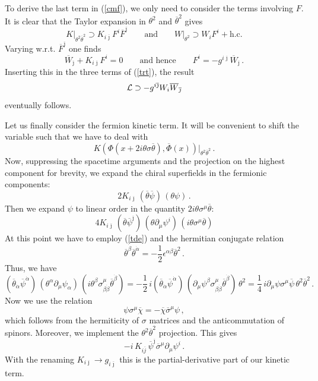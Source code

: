 \documentclass[12pt]{article}
\newcommand{\be}{\begin{equation}}
\newcommand{\ee}{\end{equation}}
\newcommand{\ol}{\overline}
\numberwithin{equation}{section}
\begin{document}
To derive the last term in (\ref{cmf}), we only need to consider the terms involving $F$. It is clear that the Taylor expansion in $\theta^2$ and $\ol{\theta}^2$ gives
\be
K\Big|_{\theta^2\ol{\theta}^2}\supset K_{i\ol{\jmath}}F^i\ol{F}^{\ol{\jmath}}
\qquad\mbox{and}\qquad
W\Big|_{\theta^2}\supset W_i F^i +\mbox{h.c.}\label{trt}
\ee
Varying w.r.t. $\ol{F}^{\ol{\jmath}}$ one finds 
\be
\ol{W}_{\ol{\jmath}}+K_{i\ol{\jmath}}F^i=0\qquad\mbox{and hence}\qquad
F^i=-g^{i\ol{\jmath}}\ol{W}_{\ol{\jmath}}\,.
\ee
Inserting this in the three terms of (\ref{trt}), the result
\be
{\cal L}\supset -g^{i\ol{\jmath}} W_i \ol{W}_{\ol{\jmath}}
\ee
eventually follows.

Let us finally consider the fermion kinetic term. It will be convenient to shift the variable such that we have to deal with
\be
K(\Phi(x+2i\theta\sigma\ol{\theta}),\ol{\Phi}(x))\Big|_{\theta^2\ol{\theta}^2}\,.
\ee
Now, suppressing the spacetime arguments and the projection on the highest component for brevity, we expand the chiral superfields in the fermionic components:
\be
2K_{i\ol{\jmath}}\,(\ol{\theta}\ol{\psi})\,(\theta\psi)\,.
\ee
Then we expand $\psi$ to linear order in the quantity $2i\theta\sigma^\mu\ol{\theta}$:
\be
4K_{i\ol{\jmath}}\,(\ol{\theta}\ol{\psi}^{\ol{\jmath}})\,
(\theta\partial_\mu\psi^i)\,(i\theta \sigma^\mu\ol{\theta})
\ee
At this point we have to employ (\ref{tde}) and the hermitian conjugate relation 
\be
\ol{\theta}^{\dot{\beta}}\ol{\theta}^{\dot{\alpha}}=-\frac{1}{2}\epsilon^{\alpha\beta}\ol{\theta}^2\,.
\ee
Thus, we have
\be
(\ol{\theta}_{\dot{\alpha}}\ol{\psi}^{\dot{\alpha}})\,(\theta^\alpha
\partial_\mu\psi_\alpha)\,(i\theta^\beta\sigma^\mu_{\beta\dot{\beta}}
\ol{\theta}^{\dot{\beta}})=-\frac{1}{2}\,i (\ol{\theta}_{\dot{\alpha}}\ol{\psi}^{\dot{\alpha}})\,(\partial_\mu\psi^\beta
\sigma^\mu_{\beta\dot{\beta}}
\ol{\theta}^{\dot{\beta}})\,\theta^2=\frac{1}{4}\,i\partial_\mu\psi
\sigma^\mu\ol{\psi}\,\theta^2\ol{\theta}^2\,.
\ee
Now we use the relation
\be
\psi\sigma^\mu\ol{\chi}=-\ol{\chi}\ol{\sigma}^\mu\psi\,,
\ee
which follows from the hermiticity of $\sigma$ matrices and the anticommutation of spinors. Moreover, we implement the $\theta^2\ol{\theta}^2$ projection. This gives
\be
-i\,K_{i\ol{j}}\,\ol{\psi}^{\ol{\jmath}}\ol{\sigma}^\mu\partial_\mu\psi^i\,.
\ee
With the renaming $K_{i\ol{\jmath}}\to g_{i\ol{\jmath}}$ this is the partial-derivative part of our kinetic term.
\end{document}
